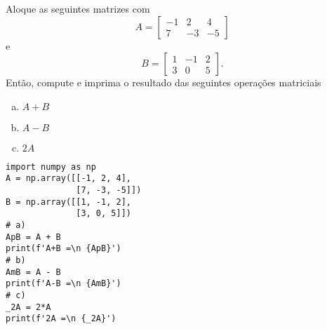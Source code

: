 \begin{exer}
  Aloque as seguintes matrizes com {\PYTHONnumpyDOTarray}
  \begin{equation}
    A =
    \begin{bmatrix}
        -1 & 2 & 4\\
        7 & -3 & -5
      \end{bmatrix}      
  \end{equation}
  e
  \begin{equation}
    B =
    \begin{bmatrix}
        1 & -1 & 2\\
        3 & 0 & 5
      \end{bmatrix}.      
  \end{equation}
  Então, compute e imprima o resultado das seguintes operações matriciais
  \begin{enumerate}[a)]
  \item $A + B$
  \item $A - B$
  \item $2A$
  \end{enumerate}
\end{exer}
\begin{resp}

\begin{lstlisting}
import numpy as np
A = np.array([[-1, 2, 4],
              [7, -3, -5]])
B = np.array([[1, -1, 2],
              [3, 0, 5]])
# a)
ApB = A + B
print(f'A+B =\n {ApB}')
# b)
AmB = A - B
print(f'A-B =\n {AmB}')
# c)
_2A = 2*A
print(f'2A =\n {_2A}')
\end{lstlisting}

\end{resp}

